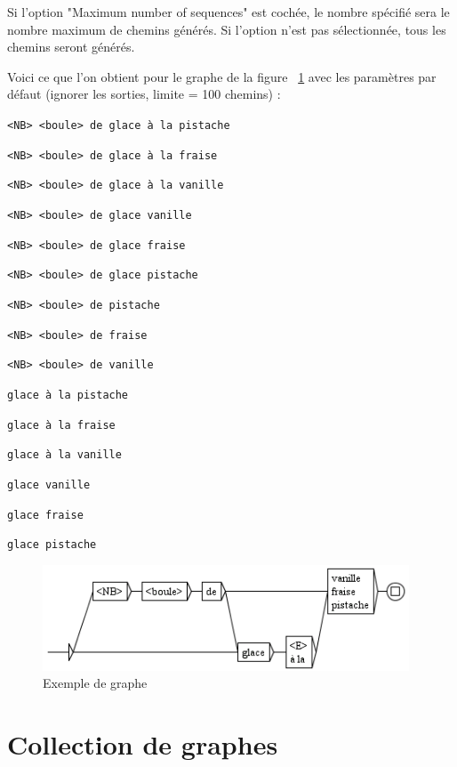 \noindent Si l’option "Maximum number of sequences" est cochée, le nombre spécifié sera le nombre
maximum de chemins générés. Si l’option n’est pas sélectionnée, tous les chemins seront générés.


\bigskip
\noindent Voici ce que l’on obtient pour le graphe de la figure ~\ref{fig-glace} 
 avec les paramètres par défaut (ignorer les sorties, limite = 100 chemins) :


\bigskip
\noindent
\texttt{<NB> <boule> de glace \`a la pistache}

\noindent
\texttt{<NB> <boule> de glace \`a la fraise}

\noindent
\texttt{<NB> <boule> de glace \`a la vanille}

\noindent
\texttt{<NB> <boule> de glace vanille}

\noindent
\texttt{<NB> <boule> de glace fraise}

\noindent
\texttt{<NB> <boule> de glace pistache}

\noindent
\texttt{<NB> <boule> de pistache}

\noindent
\texttt{<NB> <boule> de fraise}

\noindent
\texttt{<NB> <boule> de vanille}

\noindent
\texttt{glace \`a la pistache}

\noindent
\texttt{glace \`a la fraise}

\noindent
\texttt{glace \`a la vanille}

\noindent
\texttt{glace vanille}

\noindent
\texttt{glace fraise}

\noindent
\texttt{glace pistache}

\begin{figure}[!ht]
\begin{center}
\includegraphics[width=10.9cm]{resources/img/fig6-19.png}
\caption{Exemple de graphe \label{fig-glace}}
\end{center}
\end{figure}




\section{Collection de graphes}

